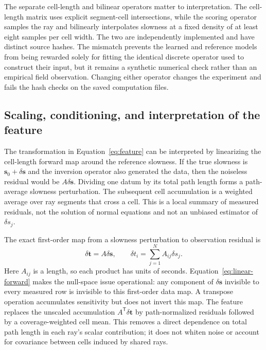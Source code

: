 \documentclass[11pt]{article}
\begin{document}
The separate cell-length and bilinear operators matter to interpretation. The cell-length matrix uses explicit segment-cell intersections, while the scoring operator samples the ray and bilinearly interpolates slowness at a fixed density of at least eight samples per cell width. The two are independently implemented and have distinct source hashes. The mismatch prevents the learned and reference models from being rewarded solely for fitting the identical discrete operator used to construct their input, but it remains a synthetic numerical check rather than an empirical field observation. Changing either operator changes the experiment and fails the hash checks on the saved computation files.

\subsection{Scaling, conditioning, and interpretation of the feature}
\label{sec:feature-scaling}
The transformation in Equation~\ref{eq:feature} can be interpreted by linearizing the cell-length forward map around the reference slowness. If the true slowness is $\mathbf{s}_0+\delta\mathbf{s}$ and the inversion operator also generated the data, then the noiseless residual would be $A\delta\mathbf{s}$. Dividing one datum by its total path length forms a path-average slowness perturbation. The subsequent cell accumulation is a weighted average over ray segments that cross a cell. This is a local summary of measured residuals, not the solution of normal equations and not an unbiased estimator of $\delta s_j$.

The exact first-order map from a slowness perturbation to observation residual is
\begin{equation}
\delta\mathbf{t}=A\delta\mathbf{s},\qquad
\delta t_i=\sum_{j=1}^{N}A_{ij}\delta s_j.
\label{eq:linear-forward}
\end{equation}
Here $A_{ij}$ is a length, so each product has units of seconds. Equation~\ref{eq:linear-forward} makes the null-space issue operational: any component of $\delta\mathbf{s}$ invisible to every measured row is invisible to this first-order data map. A transpose operation accumulates sensitivity but does not invert this map. The feature replaces the unscaled accumulation $A^{\mathsf T}\delta\mathbf{t}$ by path-normalized residuals followed by a coverage-weighted cell mean. This removes a direct dependence on total path length in each ray's scalar contribution; it does not whiten noise or account for covariance between cells induced by shared rays.
\end{document}

